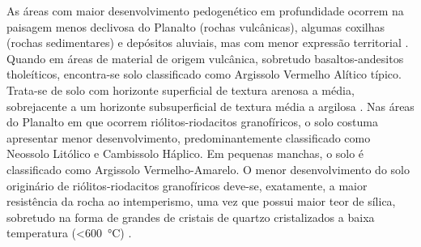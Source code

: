 
As áreas com maior desenvolvimento pedogenético em profundidade ocorrem na paisagem menos declivosa 
do Planalto (rochas vulcânicas), algumas coxilhas (rochas sedimentares) e depósitos aluviais, mas 
com menor expressão territorial \cite{Miguel2010}. Quando em áreas de material de origem vulcânica,
sobretudo basaltos-andesitos tholeíticos, encontra-se solo classificado como Argissolo Vermelho 
Alítico típico. Trata-se de solo com horizonte superficial de textura arenosa a média, sobrejacente 
a um horizonte subsuperficial de textura média a argilosa \cite{Miguel2010}. Nas áreas do Planalto 
em que ocorrem riólitos-riodacitos granofíricos, o solo costuma apresentar menor desenvolvimento, 
predominantemente classificado como Neossolo Litólico e Cambissolo Háplico. Em pequenas manchas, o 
solo é classificado como Argissolo Vermelho-Amarelo. O menor desenvolvimento do solo originário de 
riólitos-riodacitos granofíricos deve-se, exatamente, a maior resistência da rocha ao intemperismo, 
uma vez que possui maior teor de sílica, sobretudo na forma de grandes de cristais de quartzo 
cristalizados a baixa temperatura (\SI{<600}{\celsius}) \cite{Pedron2007}.

